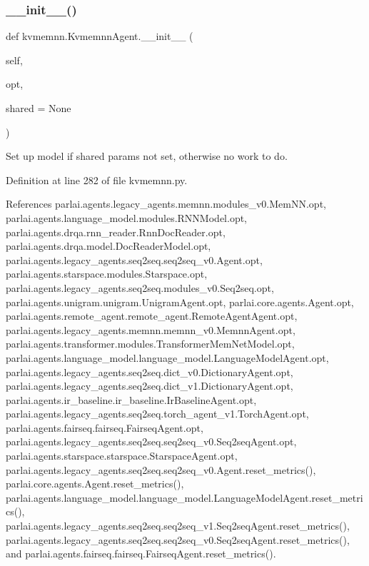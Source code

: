 \subsubsection{\texorpdfstring{\+\_\+\+\_\+init\+\_\+\+\_\+()}{\_\_init\_\_()}}
{\footnotesize\ttfamily def kvmemnn.\+Kvmemnn\+Agent.\+\_\+\+\_\+init\+\_\+\+\_\+ (\begin{DoxyParamCaption}\item[{}]{self,  }\item[{}]{opt,  }\item[{}]{shared = {\ttfamily None} }\end{DoxyParamCaption})}

\begin{DoxyVerb}Set up model if shared params not set, otherwise no work to do.\end{DoxyVerb}
 

Definition at line 282 of file kvmemnn.\+py.



References parlai.\+agents.\+legacy\+\_\+agents.\+memnn.\+modules\+\_\+v0.\+Mem\+N\+N.\+opt, parlai.\+agents.\+language\+\_\+model.\+modules.\+R\+N\+N\+Model.\+opt, parlai.\+agents.\+drqa.\+rnn\+\_\+reader.\+Rnn\+Doc\+Reader.\+opt, parlai.\+agents.\+drqa.\+model.\+Doc\+Reader\+Model.\+opt, parlai.\+agents.\+legacy\+\_\+agents.\+seq2seq.\+seq2seq\+\_\+v0.\+Agent.\+opt, parlai.\+agents.\+starspace.\+modules.\+Starspace.\+opt, parlai.\+agents.\+legacy\+\_\+agents.\+seq2seq.\+modules\+\_\+v0.\+Seq2seq.\+opt, parlai.\+agents.\+unigram.\+unigram.\+Unigram\+Agent.\+opt, parlai.\+core.\+agents.\+Agent.\+opt, parlai.\+agents.\+remote\+\_\+agent.\+remote\+\_\+agent.\+Remote\+Agent\+Agent.\+opt, parlai.\+agents.\+legacy\+\_\+agents.\+memnn.\+memnn\+\_\+v0.\+Memnn\+Agent.\+opt, parlai.\+agents.\+transformer.\+modules.\+Transformer\+Mem\+Net\+Model.\+opt, parlai.\+agents.\+language\+\_\+model.\+language\+\_\+model.\+Language\+Model\+Agent.\+opt, parlai.\+agents.\+legacy\+\_\+agents.\+seq2seq.\+dict\+\_\+v0.\+Dictionary\+Agent.\+opt, parlai.\+agents.\+legacy\+\_\+agents.\+seq2seq.\+dict\+\_\+v1.\+Dictionary\+Agent.\+opt, parlai.\+agents.\+ir\+\_\+baseline.\+ir\+\_\+baseline.\+Ir\+Baseline\+Agent.\+opt, parlai.\+agents.\+legacy\+\_\+agents.\+seq2seq.\+torch\+\_\+agent\+\_\+v1.\+Torch\+Agent.\+opt, parlai.\+agents.\+fairseq.\+fairseq.\+Fairseq\+Agent.\+opt, parlai.\+agents.\+legacy\+\_\+agents.\+seq2seq.\+seq2seq\+\_\+v0.\+Seq2seq\+Agent.\+opt, parlai.\+agents.\+starspace.\+starspace.\+Starspace\+Agent.\+opt, parlai.\+agents.\+legacy\+\_\+agents.\+seq2seq.\+seq2seq\+\_\+v0.\+Agent.\+reset\+\_\+metrics(), parlai.\+core.\+agents.\+Agent.\+reset\+\_\+metrics(), parlai.\+agents.\+language\+\_\+model.\+language\+\_\+model.\+Language\+Model\+Agent.\+reset\+\_\+metrics(), parlai.\+agents.\+legacy\+\_\+agents.\+seq2seq.\+seq2seq\+\_\+v1.\+Seq2seq\+Agent.\+reset\+\_\+metrics(), parlai.\+agents.\+legacy\+\_\+agents.\+seq2seq.\+seq2seq\+\_\+v0.\+Seq2seq\+Agent.\+reset\+\_\+metrics(), and parlai.\+agents.\+fairseq.\+fairseq.\+Fairseq\+Agent.\+reset\+\_\+metrics().

